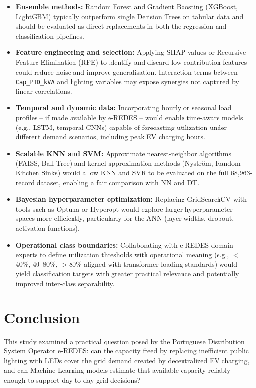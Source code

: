 \documentclass[conference]{IEEEtran}
\begin{document}
\begin{itemize}
  \item \textbf{Ensemble methods:} Random Forest and Gradient Boosting (XGBoost, LightGBM) typically outperform single Decision Trees on tabular data and should be evaluated as direct replacements in both the regression and classification pipelines.

  \item \textbf{Feature engineering and selection:} Applying SHAP values or Recursive Feature Elimination (RFE) to identify and discard low-contribution features could reduce noise and improve generalisation. Interaction terms between \texttt{Cap\_PTD\_kVA} and lighting variables may expose synergies not captured by linear correlations.

  \item \textbf{Temporal and dynamic data:} Incorporating hourly or seasonal load profiles -- if made available by e-REDES -- would enable time-aware models (e.g., LSTM, temporal CNNs) capable of forecasting utilization under different demand scenarios, including peak EV charging hours.

  \item \textbf{Scalable KNN and SVM:} Approximate nearest-neighbor algorithms (FAISS, Ball Tree) and kernel approximation methods (Nyström, Random Kitchen Sinks) would allow KNN and SVR to be evaluated on the full 68,963-record dataset, enabling a fair comparison with NN and DT.

  \item \textbf{Bayesian hyperparameter optimization:} Replacing GridSearchCV with tools such as Optuna or Hyperopt would explore larger hyperparameter spaces more efficiently, particularly for the ANN (layer widths, dropout, activation functions).

  \item \textbf{Operational class boundaries:} Collaborating with e-REDES domain experts to define utilization thresholds with operational meaning (e.g., $<$40\%, 40--80\%, $>$80\% aligned with transformer loading standards) would yield classification targets with greater practical relevance and potentially improved inter-class separability.
\end{itemize}

\section{Conclusion}

This study examined a practical question posed by the Portuguese Distribution System Operator e-REDES: can the capacity freed by replacing inefficient public lighting with LEDs cover the grid demand created by decentralized EV charging, and can Machine Learning models estimate that available capacity reliably enough to support day-to-day grid decisions?
\end{document}
